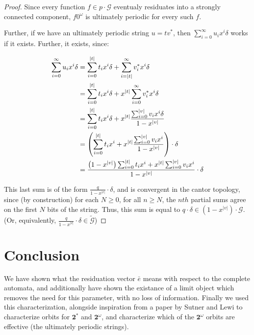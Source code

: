 \documentclass[12pt]{article}
\newcommand{\G}{\mathcal{G}}
\newcommand{\2}{\textbf{2}}
\newcommand{\e}{\bar{e}}
\begin{document}
\begin{proof}
  Since every function $f \in p \cdot \G$ eventualy residuates into a 
  strongly connected component, $f 0^\omega$ is ultimately periodic for
  every such $f$.

  Further, if we have an ultimately periodic string $u = tv^*$, then
  $\sum_{i=0}^{\infty} u_i x^i \delta$ works if it exists. Further,
  it exists, since:

  \begin{align*}
    \sum_{i=0}^{\infty} u_i x^i \delta 
    &= \sum_{i=0}^{|t|} t_i x^i \delta 
        + \sum_{i=|t|}^{\infty} v^*_i x^i \delta\\
    &= \sum_{i=0}^{|t|} t_i x^i \delta 
        + x^{|t|} \sum_{i=0}^{\infty} v^*_i x^i \delta\\
    &= \sum_{i=0}^{|t|} t_i x^i \delta 
         + x^{|t|} \frac{\sum_{i=0}^{|v|} v_i x^i \delta}{1 - x^{|v|}}\\
    &= \left ( 
        \sum_{i=0}^{|t|} t_i x^i
        + x^{|t|} \frac{\sum_{i=0}^{|v|} v_i x^i}{1 - x^{|v|}}
       \right ) \cdot \delta\\
    &= \frac%
        {%
          \left ( 1 - x^{|v|} \right ) \sum_{i=0}^{|t|} t_i x^i + 
          x^{|t|} \sum_{i=0}^{|v|} v_i x^i
        }
        {1 - x^{|v|}}
       \cdot \delta\\
  \end{align*}
   

  This last sum is of the form $\frac{q}{1 - x^{|v|}} \cdot \delta$, 
  and is convergent in the cantor topology, since (by construction)
  for each $N \geq 0$, for all $n \geq N$, the $nth$ partial sums 
  agree on the first $N$ bits of the string.
  Thus, this sum is equal to $q \cdot \delta \in (1 - x^{|v|}) \cdot \G$.
  (Or, equivalently, $\frac{q}{1 - x^{|v|}} \cdot \delta \in \widetilde{\G}$)
\end{proof}

\section{Conclusion}
We have shown what the residuation vector $\e$ means with respect to the
complete automata, and additionally have shown the existance of a limit
object which removes the need for this parameter, with no loss of information.
Finally we used this characterization, alongside inspiration from a paper
by Sutner and Lewi \cite{SutnerLewi12:iter_inver_bin_trans} to characterize
orbits for $\2^*$ and $\2^\omega$, and characterize which of the $\2^\omega$
orbits are effective (the ultimately periodic strings).

\newpage



\end{document}
